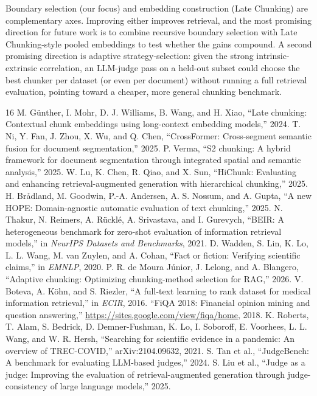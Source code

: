 \documentclass[conference]{IEEEtran}
\begin{document}
Boundary selection (our focus) and embedding construction (Late Chunking)
are complementary axes. Improving either improves retrieval, and the most
promising direction for future work is to combine recursive boundary
selection with Late Chunking-style pooled embeddings to test whether the
gains compound. A second promising direction is adaptive
strategy-selection: given the strong intrinsic-extrinsic correlation, an
LLM-judge pass on a held-out subset could choose the best chunker per
dataset (or even per document) without running a full retrieval
evaluation, pointing toward a cheaper, more general chunking benchmark.

\begin{thebibliography}{16}
 M. G\"unther, I. Mohr, D. J. Williams, B. Wang,
and H. Xiao, ``Late chunking: Contextual chunk embeddings using
long-context embedding models,'' 2024.
 T. Ni, Y. Fan, J. Zhou, X. Wu, and Q. Chen,
``CrossFormer: Cross-segment semantic fusion for document segmentation,''
2025.
 P. Verma, ``S2 chunking: A hybrid framework for
document segmentation through integrated spatial and semantic analysis,''
2025.
 W. Lu, K. Chen, R. Qiao, and X. Sun, ``HiChunk:
Evaluating and enhancing retrieval-augmented generation with hierarchical
chunking,'' 2025.
 H. Br{\aa}dland, M. Goodwin, P.-A. Andersen,
A. S. Nossum, and A. Gupta, ``A new HOPE: Domain-agnostic automatic
evaluation of text chunking,'' 2025.
 N. Thakur, N. Reimers, A. R\"uckl\'e,
A. Srivastava, and I. Gurevych, ``BEIR: A heterogeneous benchmark for
zero-shot evaluation of information retrieval models,'' in \emph{NeurIPS
Datasets and Benchmarks}, 2021.
 D. Wadden, S. Lin, K. Lo, L. L. Wang,
M. van Zuylen, and A. Cohan, ``Fact or fiction: Verifying scientific
claims,'' in \emph{EMNLP}, 2020.
 P. R. de Moura J\'unior, J. Lelong, and
A. Blangero, ``Adaptive chunking: Optimizing chunking-method selection for
RAG,'' 2026.
 V. Boteva, A. K\"ohn, and S. Riezler, ``A
full-text learning to rank dataset for medical information retrieval,'' in
\emph{ECIR}, 2016.
 ``FiQA 2018: Financial opinion mining and question
answering,'' \url{https://sites.google.com/view/fiqa/home}, 2018.
 K. Roberts, T. Alam, S. Bedrick,
D. Demner-Fushman, K. Lo, I. Soboroff, E. Voorhees, L. L. Wang, and
W. R. Hersh, ``Searching for scientific evidence in a pandemic: An
overview of TREC-COVID,'' arXiv:2104.09632, 2021.
 S. Tan et al., ``JudgeBench: A benchmark for
evaluating LLM-based judges,'' 2024.
 S. Liu et al., ``Judge as a judge: Improving the
evaluation of retrieval-augmented generation through judge-consistency of
large language models,'' 2025.
\end{thebibliography}
\end{document}
